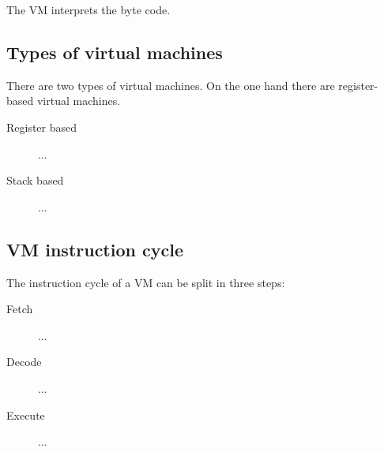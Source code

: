 The VM interprets the byte code. 

\subsection{Types of virtual machines}
There are two types of virtual machines. On the one hand there are register-based virtual machines.
\begin{description}
  \item[Register based] ...
  \item[Stack based] ...
\end{description}

\subsection{VM instruction cycle}
The instruction cycle of a VM can be split in three steps:
\begin{description}
  \item[Fetch] ...
  \item[Decode] ...
  \item[Execute] ...
\end{description}

